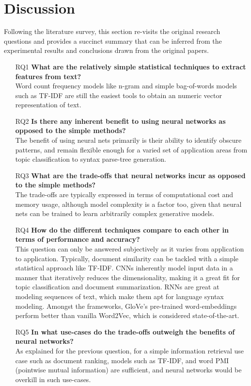 \documentclass[11pt,a4paper]{article}
\begin{document}


\section{Discussion} %
\label{sec:discussion}

  Following the literature survey, this section re-visits the original research questions and provides a succinct summary that can be inferred from the experimental results and conclusions drawn from the original papers.\\

  \begin{itemize}
    \item [RQ1]
    \textbf{What are the relatively simple statistical techniques to extract features from text?} \\
    Word count frequency models like n-gram and simple bag-of-words models such as TF-IDF are still the easiest tools to obtain an numeric vector representation of text.
    \item [RQ2]
    \textbf{Is there any inherent benefit to using neural networks as opposed to the simple methods?} \\
    The benefit of using neural nets primarily is their ability to identify obscure patterns, and remain flexible enough for a varied set of application areas from topic classification to syntax parse-tree generation.
    \item [RQ3]
    \textbf{What are the trade-offs that neural networks incur as opposed to the simple methods?} \\
    The trade-offs are typically expressed in terms of computational cost and memory usage, although model complexity is a factor too, given that neural nets can be trained to learn arbitrarily complex generative models.
    \item [RQ4]
    \textbf{How do the different techniques compare to each other in terms of performance and accuracy?} \\
    This question can only be answered subjectively as it varies from application to application. Typically, document similarity can be tackled with a simple statistical approach like TF-IDF. CNNs inherently model input data in a manner that iteratively reduces the dimensionality, making it a great fit for topic classification and document summarization. RNNs are great at modeling sequences of text, which make them apt for language syntax modeling. Amongst the frameworks, GloVe's pre-trained word-embeddings perform better than vanilla Word2Vec, which is considered state-of-the-art.
    \item [RQ5]
    \textbf{In what use-cases do the trade-offs outweigh the benefits of neural networks?} \\
    As explained for the previous question, for a simple information retrieval use case such as document ranking, models such as TF-IDF, and word PMI (pointwise mutual information) are sufficient, and neural networks would be overkill in such use-cases.
  \end{itemize}
\end{document}
